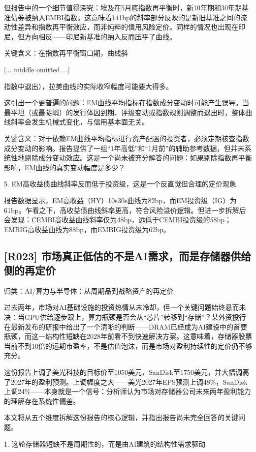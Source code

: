 \documentclass[11pt]{ctexart}
\begin{document}
但报告中的一个细节值得深究：埃及在5月底指数再平衡时，新10年期和30年期基准债券被纳入EMBI指数。这意味着141bp的斜率部分反映的是新旧基准之间的流动性差异和指数再平衡效应，而非纯粹的信用风险定价。同样的情况也出现在印尼，但方向相反——印尼新基准的纳入反而压平了曲线。

关键含义：在指数再平衡窗口期，曲线斜

[... middle omitted ...]

指数中退出），拉美曲线的实际收窄幅度可能要大得多。

这引出一个更普遍的问题：EM曲线平均指标在指数成分变动时可能产生误导。当最平坦（或最陡峭）的发行体因到期、评级变动或指数规则调整而退出时，整体曲线斜率会发生机械式变化，与信用基本面无关。

关键含义：对于依赖EM曲线平均指标进行资产配置的投资者，必须定期核查指数成分变动的影响。报告提供了一组“1年高低”和“1月前”的辅助参考数据，但并未系统性地剔除成分变动效应。这是一个尚未被充分解答的问题：如果剔除指数再平衡影响，EM曲线的真实变动幅度是多少？

5. EM高收益债曲线斜率反而低于投资级，这是一个反直觉但合理的定价现象

报告数据显示，EM高收益（HY）10s30s曲线为82bp，而EM投资级（IG）为61bp。乍看之下，高收益债曲线斜率更高，符合风险溢价逻辑。但进一步拆解后会发现：CEMBI高收益曲线斜率仅为48bp，远低于CEMBI投资级的58bp；EMBIG高收益曲线为88bp，而EMBIG投资级为62bp。

\subsection{[R023] 市场真正低估的不是AI需求，而是存储器供给侧的再定价}
{\small\color{refgray}归类：AI/算力与半导体：从周期品到战略资产的再定价}

过去两年，市场对AI基础设施的投资热情从未冷却，但一个关键问题始终悬而未决：当GPU供给逐步跟上，算力瓶颈是否会从“芯片”转移到“存储”？某外资投行在最新发布的研报中给出了一个清晰的判断——DRAM已经成为AI建设中的首要瓶颈，而这一结构性短缺在2028年前看不到快速解决方案。这意味着，存储器股票当前不到10倍的远期市盈率，不是估值泡沫，而是市场对盈利持续性的定价仍不够充分。

这份报告上调了美光科技的目标价至1050美元，SanDisk至1750美元，并大幅调高了2027年的盈利预测。上调幅度之大——美光2027年EPS预测上调48\%，SanDisk上调24\%——本身就是一个信号：分析师认为市场对存储器公司未来两年盈利能力的理解存在系统性偏差。

本文将从五个维度拆解这份报告的核心逻辑，并指出报告尚未完全回答的关键问题。

1. 这轮存储器短缺不是周期性的，而是由AI建筑的结构性需求驱动
\end{document}
